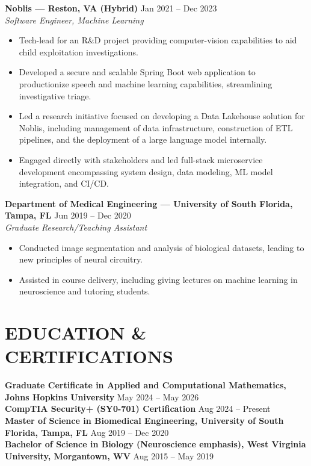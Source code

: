 \documentclass[10pt, letterpaper]{article}
\newcommand{\company}[2]{\textbf{#1} \hfill #2 \\[-1pt]}
\newcommand{\role}[1]{\textit{#1}}
\begin{document}
\vspace{5pt}
\company{Noblis --- Reston, VA (Hybrid)}{Jan 2021 -- Dec 2023}
\role{Software Engineer, Machine Learning}
\begin{itemize}
    \item Tech-lead for an R\&D project providing computer-vision capabilities to aid child exploitation investigations.
    \item Developed a secure and scalable Spring Boot web application to productionize speech and machine learning capabilities, streamlining investigative triage.
    \item Led a research initiative focused on developing a Data Lakehouse solution for Noblis, including management of data infrastructure, construction of ETL pipelines, and the deployment of a large language model internally.
    \item Engaged directly with stakeholders and led full-stack microservice development encompassing system design, data modeling, ML model integration, and CI/CD.
\end{itemize}

\vspace{5pt}
\company{Department of Medical Engineering --- University of South Florida, Tampa, FL}{Jun 2019 -- Dec 2020}
\role{Graduate Research/Teaching Assistant}
\begin{itemize}
    \item Conducted image segmentation and analysis of biological datasets, leading to new principles of neural circuitry.
    \item Assisted in course delivery, including giving lectures on machine learning in neuroscience and tutoring students.
\end{itemize}

\section*{EDUCATION \& CERTIFICATIONS}

\textbf{Graduate Certificate in Applied and Computational Mathematics, Johns Hopkins University} \hfill May 2024 -- May 2026 \\[2pt]
\textbf{CompTIA Security+ (SY0-701) Certification} \hfill Aug 2024 -- Present \\[2pt]
\textbf{Master of Science in Biomedical Engineering, University of South Florida, Tampa, FL} \hfill Aug 2019 -- Dec 2020 \\[2pt]
\textbf{Bachelor of Science in Biology (Neuroscience emphasis), West Virginia University, Morgantown, WV} \hfill Aug 2015 -- May 2019
\end{document}
